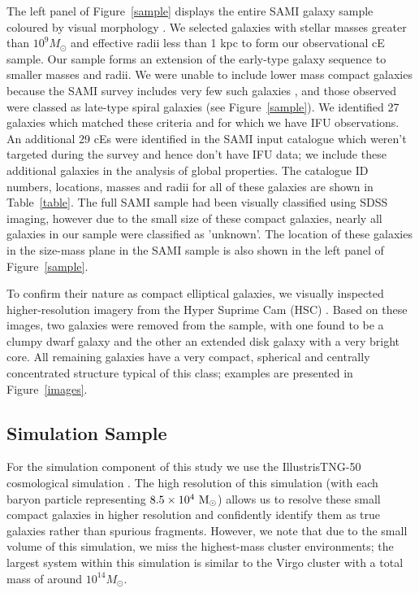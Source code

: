 \documentclass[a4paper,fleqn,usenatbib]{mnras}
\begin{document}
The left panel of Figure~\ref{sample} displays the entire SAMI galaxy sample coloured by visual morphology \citep{2016MNRAS.463..170C}. We selected galaxies with stellar masses greater than $10^{9} M_{\odot}$ and effective radii less than 1 kpc to form our observational cE sample. Our sample forms an extension of the early-type galaxy sequence to smaller masses and radii. We were unable to include lower mass compact galaxies because the SAMI survey includes very few such galaxies \citep{2015MNRAS.447.2857B}, and those observed were classed as late-type spiral galaxies (see Figure~\ref{sample}). We identified 27 galaxies which matched these criteria and for which we have IFU observations. An additional 29 cEs were identified in the SAMI input catalogue which weren't targeted during the survey and hence don't have IFU data; we include these additional galaxies in the analysis of global properties. The catalogue ID numbers, locations, masses and radii for all of these galaxies are shown in Table~\ref{table}. The full SAMI sample had been visually classified using SDSS imaging, however due to the small size of these compact galaxies, nearly all galaxies in our sample were classified as 'unknown'. The location of these galaxies in the size-mass plane in the SAMI sample is also shown in the left panel of Figure~\ref{sample}.

To confirm their nature as compact elliptical galaxies, we visually inspected higher-resolution imagery from the Hyper Suprime Cam (HSC) \citep{2019PASJ...71..114A}. Based on these images, two galaxies were removed from the sample, with one found to be a clumpy dwarf galaxy and the other an extended disk galaxy with a very bright core. All remaining galaxies have a very compact, spherical and centrally concentrated structure typical of this class; examples are presented in Figure~\ref{images}. 

\subsection{Simulation Sample}

For the simulation component of this study we use the IllustrisTNG-50 cosmological simulation \citep{2019ComAC...6....2N,2019MNRAS.490.3196P,2018MNRAS.475..624N,2018MNRAS.475..676S,2018MNRAS.477.1206N,2018MNRAS.480.5113M}. The high resolution of this simulation (with each baryon particle representing $8.5 \times 10^{4} ~\rm M_{\odot}$) allows us to resolve these small compact galaxies in higher resolution and confidently identify them as true galaxies rather than spurious fragments. However, we note that due to the small volume of this simulation, we miss the highest-mass cluster environments; the largest system within this simulation is similar to the Virgo cluster with a total mass of around $10^{14} M_{\odot}$.   
\end{document}
